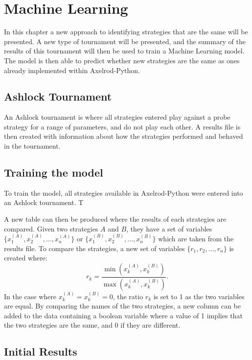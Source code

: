 
\chapter{Machine Learning}\label{cha:machinelearning}

In this chapter a new approach to identifying strategies that are the same will be presented.
A new type of tournament will be presented, and the summary of the results of this tournament will then be used to train a Machine Learning model.
The model is then able to predict whether new strategies are the same as ones already implemented within Axelrod-Python.

\section{Ashlock Tournament}\label{sec:ashlock_tourn}
An Ashlock tournament is where all strategies entered play against a probe strategy for a range of parameters, and do not play each other.
A results file is then created with information about how the strategies performed and behaved in the tournament.





\section{Training the model}\label{sec:training_model}

To train the model, all strategies available in Axelrod-Python were entered into an Ashlock tournament.
T

A new table can then be produced where the results of each strategies are compared.
Given two strategies $A$ and $B$, they have a set of variables $\{x_1^{(A)}, x_2^{(A)}, \dots, x_n^{(A)}\}$ or $\{x_1^{(B)}, x_2^{(B)}, \dots, x_n^{(B)}\}$ which are taken from the results file.
To compare the strategies, a new set of variables $\{r_1, r_2, \dots, r_n \}$ is created where:
$$
r_k = \frac{\min(x_k^{(A)}, x_k^{(B)})}{\max(x_k^{(A)}, x_k^{(B)})}.
$$
In the case where $x_k^{(A)} = x_k^{(B)} = 0$, the ratio $r_k$ is set to 1 as the two variables are equal.
By comparing the names of the two strategies, a new column can be added to the data containing a boolean variable where a value of 1 implies that the two strategies are the same, and 0 if they are different.


\section{Initial Results}

